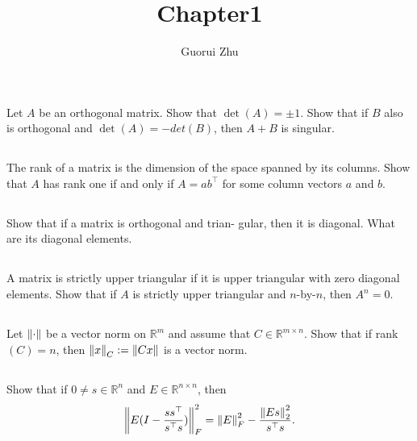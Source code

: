 \documentclass[a4paper]{ctexart}
\newcommand{\pf}{\textbf{\color{pink}{proof:}}}
\begin{document}
\title{Chapter1}
\author{Guorui Zhu}
\maketitle

\section{}

\subsection{} 
Let $A$ be an orthogonal matrix. Show that
$\det(A) = \pm 1$. Show that if $B$ also is orthogonal and $\det(A) = -det(B)$, then
$A + B$ is singular.

\pf

\subsection{}
The rank of a matrix is the dimension of the
space spanned by its columns. Show that $A$ has rank one if and only if $A = ab^\top$
for some column vectors $a$ and $b$.

\pf

\subsection{}
Show that if a matrix is orthogonal and trian-
gular, then it is diagonal. What are its diagonal elements.

\pf

\subsection{}
A matrix is strictly upper triangular if it is
upper triangular with zero diagonal elements. Show that if $A$ is strictly upper
triangular and $n$-by-$n$, then $A^n = 0$.

\pf

\subsection{}
Let $\norm{\cdot}$ be a vector norm on $\mathbb R^m$ and assume
that $C \in \mathbb R^{m\times n}$. Show that if rank$(C) = n$, then $\norm{x}_C:=\norm{Cx}$ is a vector
norm.

\pf

\subsection{}
Show that if $0 \neq s \in \mathbb R^n$ and $E \in \mathbb R^{n\times n}$, then
\begin{equation*}
    \norm{E(I-\frac{ss^\top}{s^\top s})}^2_F = \norm{E}_F^2 - \frac{\norm{Es}_2^2}{s^\top s}.
\end{equation*}
\end{document}
